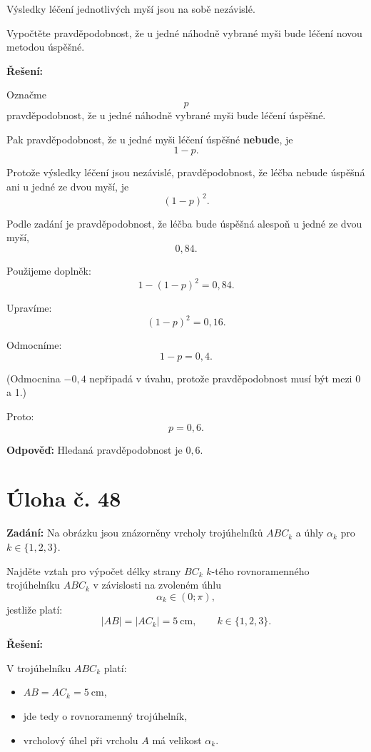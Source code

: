 \documentclass[12pt,a4paper]{article}
\begin{document}
Výsledky léčení jednotlivých myší jsou na sobě nezávislé.

Vypočtěte pravděpodobnost, že u jedné náhodně vybrané myši bude léčení novou metodou úspěšné.

\bigskip

\textbf{Řešení:}

Označme
\[
p
\]
pravděpodobnost, že u jedné náhodně vybrané myši bude léčení úspěšné.

Pak pravděpodobnost, že u jedné myši léčení úspěšné \textbf{nebude}, je
\[
1-p.
\]

Protože výsledky léčení jsou nezávislé, pravděpodobnost, že léčba nebude úspěšná ani u jedné ze dvou myší, je
\[
(1-p)^2.
\]

Podle zadání je pravděpodobnost, že léčba bude úspěšná alespoň u jedné ze dvou myší,
\[
0{,}84.
\]

Použijeme doplněk:
\[
1-(1-p)^2=0{,}84.
\]

Upravíme:
\[
(1-p)^2=0{,}16.
\]

Odmocníme:
\[
1-p=0{,}4.
\]

(Odmocnina \(-0{,}4\) nepřipadá v úvahu, protože pravděpodobnost musí být mezi 0 a 1.)

Proto:
\[
p=0{,}6.
\]

\bigskip

\textbf{Odpověď:}  
Hledaná pravděpodobnost je \(0{,}6\).



\newpage
\section*{Úloha č. 48}

\textbf{Zadání:}  
Na obrázku jsou znázorněny vrcholy trojúhelníků \(ABC_k\) a úhly \(\alpha_k\) pro \(k\in\{1,2,3\}\).

Najděte vztah pro výpočet délky strany \(BC_k\) \(k\)-tého rovnoramenného trojúhelníku \(ABC_k\) v závislosti na zvoleném úhlu
\[
\alpha_k\in(0;\pi),
\]
jestliže platí:
\[
|AB|=|AC_k|=5\ \text{cm},\qquad k\in\{1,2,3\}.
\]

\bigskip

\textbf{Řešení:}

V trojúhelníku \(ABC_k\) platí:
\begin{itemize}
    \item \(AB=AC_k=5\ \text{cm}\),
    \item jde tedy o rovnoramenný trojúhelník,
    \item vrcholový úhel při vrcholu \(A\) má velikost \(\alpha_k\).
\end{itemize}
\end{document}
